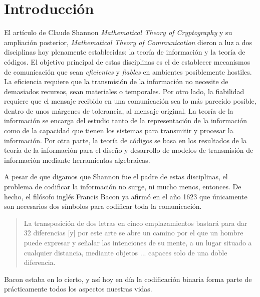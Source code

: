 \chapter*{Introducción}
 
El artículo de Claude Shannon \textit{Mathematical Theory of Cryptography} \parencite{shannon_mathematical_1945} y su ampliación posterior, \textit{Mathematical Theory of Communication} \parencite{shannon_mathematical_1948} dieron a luz a dos disciplinas hoy plenamente establecidas: la teoría de información y la teoría de códigos.
El objetivo principal de estas disciplinas es el de establecer mecanismos de comunicación que sean \emph{eficientes} y \emph{fiables} en ambientes posiblemente hostiles.
La eficiencia requiere que la transmisión de la información no necesite de demasiados recursos, sean materiales o temporales.
Por otro lado, la fiabilidad requiere que el mensaje recibido en una comunicación sea lo más parecido posible, dentro de unos márgenes de tolerancia, al mensaje original.
La teoría de la información se encarga del estudio tanto de la representación de la información como de la capacidad que tienen los sistemas para transmitir y procesar la información. 
Por otra parte, la teoría de códigos se basa en los resultados de la teoría de la información para el diseño y desarrollo de modelos de transmisión de información mediante herramientas algebraicas.

A pesar de que digamos que Shannon fue el padre de estas disciplinas, el problema de codificar la información no surge, ni mucho menos, entonces.
De hecho, el filósofo inglés Francis Bacon ya afirmó en el año 1623 que únicamente son necesarios dos símbolos para codificar toda la comunicación.
\blockquote[{\cite[30]{dyson_catedral_2015}}]{La transposición de dos letras en cinco emplazamientos bastará para dar 32 diferencias [y] por este arte se abre un camino por el que un hombre puede expresar y señalar las intenciones de su mente, a un lugar situado a cualquier distancia, mediante objetos ... capaces solo de una doble diferencia.}
Bacon estaba en lo cierto, y así hoy en día la codificación binaria forma parte de prácticamente todos los aspectos nuestras vidas.

